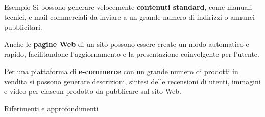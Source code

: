 \documentclass[
    notheorems,
    11pt,
    compress,
    aspectratio=169
]{beamer}
\begin{document}
\begin{frame}

    \begin{block}{Esempio}
        Si possono generare velocemente \textbf{contenuti standard}, come manuali tecnici, e-mail commerciali da inviare a un grande numero di indirizzi o annunci pubblicitari.

        \vspace{\baselineskip}

        Anche le \textbf{pagine Web} di un sito possono essere create un modo automatico e rapido, facilitandone l'aggiornamento e la presentazione coinvolgente per l'utente.

        \vspace{\baselineskip}

        Per una piattaforma di \textbf{e-commerce} con un grande numero di prodotti in vendita si possono generare descrizioni, sintesi delle recensioni di utenti, immagini e video per ciascun prodotto da pubblicare sul sito Web.
    \end{block}
\end{frame}


\begin{frame}{Riferimenti e approfondimenti}
    \printbibliography
\end{frame}

\end{document}
